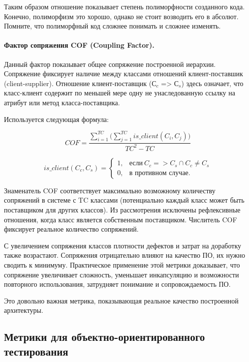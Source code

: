 \documentclass{../../text-style}
\begin{document}
Таким образом отношение показывает степень полиморфности созданного кода. Конечно, полиморфизм это хорошо, однако не стоит возводить его в абсолют. Помните, что полиморфный код сложнее понимать и сложнее изменять.

\paragraph{Фактор сопряжения COF (Coupling Factor).} Данный фактор показывает общее сопряжение построенной иерархии. Сопряжение фиксирует наличие между классами отношений клиент-поставшик (client-supplier). Отношение клиент-поставщик ($С_c$ => $С_s$) здесь означает, что класс-клиент содержит по меньшей мере одну не унаследованную ссылку на атрибут или метод класса-поставщика.

Используется следующая формула:

$$COF = \frac{\sum\limits_{i=1}^{TC}\Biggl(\sum\limits_{j=1}^{TC}is\_client(C_i, C_j)\Biggl)}{TC^2 - TC}$$

\begin{equation*}
    is\_client(C_c, C_s) = \begin{cases}
        1, & \text{если}\ C_c => C_s \cap C_c \neq C_s \\
        0, & \text{в противном случае}.
    \end{cases}
\end{equation*}

Знаменатель COF соответствует максимально возможному количеству сопряжений в системе с TC классами (потенциально каждый класс может быть поставщиком для других классов). Из рассмотрения исключены рефлексивные отношения, когда класс является собственным поставщиком. Числитель COF фиксирует реальное количество сопряжений.

С увеличением сопряжения классов плотности дефектов и затрат на доработку также возрастают. Сопряжения отрицательно влияют на качество ПО, их нужно сводить к минимуму. Практическое применение этой метрики доказывает, что сопряжение увеличивает сложность, уменьшает инкапсуляцию и возможности повторного использования, затрудняет понимание и сопровождаемость ПО.

Это довольно важная метрика, показывающая реальное качество построенной архитектуры.

\subsection{Метрики для объектно-ориентированного тестирования}
\end{document}
